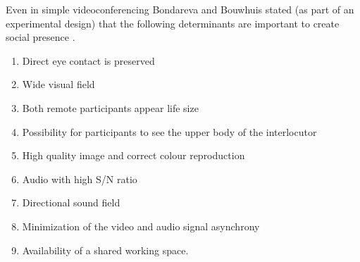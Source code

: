        Even in simple videoconferencing Bondareva and Bouwhuis stated (as part of an experimental design) that the following determinants are important to create social presence \cite{Bondareva2004, jouppi2002mutually}. 
            \begin{enumerate}
            \item    Direct eye contact is preserved
            \item    Wide visual field
            \item    Both remote participants appear life size
            \item    Possibility for participants to see the upper body of the interlocutor
            \item    High quality image and correct colour reproduction
            \item    Audio with high S/N ratio
            \item    Directional sound field
            \item    Minimization of the video and audio signal asynchrony
            \item    Availability of a shared working space.
            \end{enumerate}
			
